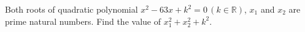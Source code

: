 Both roots of quadratic polynomial $x^{2}-63x+k^{2}=0\,(k\in\mathbb{R})$, $x_{1}$ and $x_{2}$ are prime natural numbers. Find the value of $x_{1}^{2}+x_{2}^{2}+k^{2}$.
